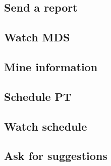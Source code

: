 \subsection{Send a report}


\subsection{Watch MDS}


\subsection{Mine information}


\subsection{Schedule PT}


\subsection{Watch schedule}


\subsection{Ask for suggestions}

